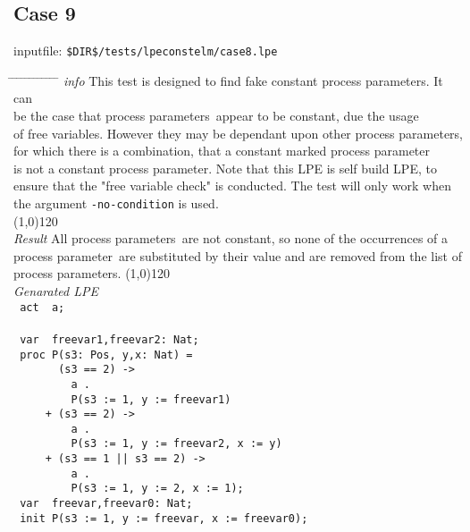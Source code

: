 \index{}\documentclass[a4paper,10pt]{article}
\theoremstyle{plain}
\theoremstyle{definition}
\newcommand{\pp}{process parameter}
\newcommand{\pps}{process parameters}
\newcommand{\ti}{\textit}
\newcommand{\tabw}{\hspace*{15.mm} \= \hspace*{20.mm} \= \hspace*{5.mm} \= \hspace*{5.mm} \= \hspace*{5.mm} \= \hspace*{5.mm}  \= \hspace*{5.mm}  \= \hspace*{5.mm}  \= \hspace*{5.mm} \= \hspace*{5.mm} \= \hspace*{5.mm}  \= \hspace*{5.mm}  \= \hspace*{5.mm}\kill}
\begin{document}
\subsection*{Case 9}
inputfile: \verb"$DIR$/tests/lpeconstelm/case8.lpe"
\begin{tabbing}
\tabw
\ti{info} \> This test is designed to find fake constant \pps . It can \\
\> be the case that \pps\ appear to be constant, due the usage \\
\> of free variables. However they may be dependant upon other \pps , \\
\> for which there is a combination, that a constant marked \pp\ \\
\> is not a constant \pp . Note that this LPE is self build LPE, to \\
\> ensure that the "free variable check" is conducted. The test will only work when \\
\> the argument \verb"-no-condition" is used.\\
\line(1,0){120}\\
\ti{Result} \> All \pps\ are not constant, so none of the occurrences of a \\
\> \pp\ are substituted by their value and are removed from the list of \\ 
\> \pps . 
\line(1,0){120}\\
\ti{Genarated LPE} \\
\>  \verb" act  a;"\\
\>  \verb""\\
\>  \verb" var  freevar1,freevar2: Nat;"\\
\>  \verb" proc P(s3: Pos, y,x: Nat) ="\\
\>  \verb"       (s3 == 2) ->"\\
\>  \verb"         a ."\\
\>  \verb"         P(s3 := 1, y := freevar1)"\\
\>  \verb"     + (s3 == 2) ->"\\
\>  \verb"         a ."\\
\>  \verb"         P(s3 := 1, y := freevar2, x := y)"\\
\>  \verb"     + (s3 == 1 || s3 == 2) ->"\\
\>  \verb"         a ."\\
\>  \verb"         P(s3 := 1, y := 2, x := 1);"\\
\>  \verb""
\>  \verb" var  freevar,freevar0: Nat;"\\
\>  \verb" init P(s3 := 1, y := freevar, x := freevar0);"\\
\end{tabbing}
\end{document}
